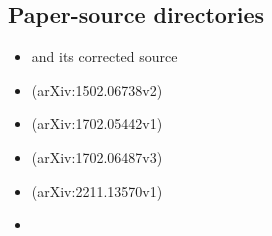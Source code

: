 \documentclass[11pt,oneside]{article}
\numberwithin{equation}{section}
\theoremstyle{definition}
\theoremstyle{remark}
\begin{document}
\subsection*{Paper-source directories}
\begin{itemize}[leftmargin=8mm]
\item {} and its corrected source
\item {} (arXiv:1502.06738v2)
\item {} (arXiv:1702.05442v1)
\item {} (arXiv:1702.06487v3)
\item {} (arXiv:2211.13570v1)
\item {}
\end{itemize}
\end{document}
